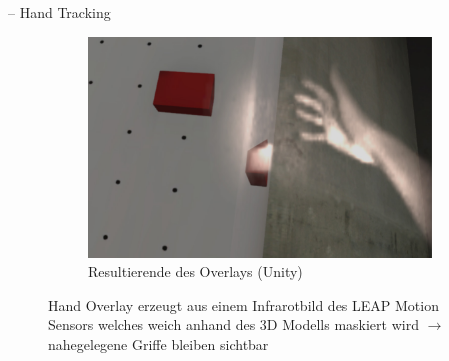 \begin{frame}{\currentname{} -- Hand Tracking}
\begin{figure}
\begin{subfigure}[t]{0.32\textwidth}
		\includegraphics[width=\textwidth]{include/images/leap-motion-overlay-result.jpg}
		\caption{Resultierende des Overlays (Unity)}
		\label{fig:leap-motion-overlay-result}
	\end{subfigure}
	\captionsetup{subrefformat=parens}
	\caption[Leap Motion hand tracking]{Hand Overlay erzeugt aus einem Infrarotbild des LEAP Motion Sensors  welches weich anhand des 3D Modells maskiert wird $\rightarrow$ nahegelegene Griffe bleiben sichtbar }
	\label{fig:leap-motion-overlay}
\end{figure}
\end{frame}

